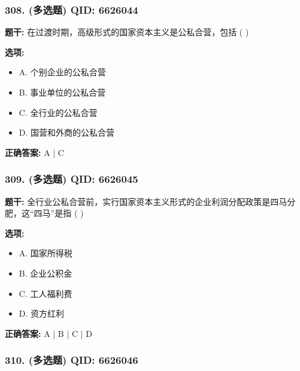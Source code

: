 \documentclass[12pt,UTF8]{ctexart}
\begin{document}
\subsubsection*{308. (多选题) \small QID: 6626044}

\textbf{题干:}
在过渡时期，高级形式的国家资本主义是公私合营，包括  ( )

\textbf{选项:}
\begin{itemize}[leftmargin=*]

  \item A. 个别企业的公私合营

  \item B. 事业单位的公私合营

  \item C. 全行业的公私合营

  \item D. 国营和外商的公私合营

\end{itemize}

\textbf{正确答案:}
A | C

\vspace{0.3em}\hrulefill\vspace{0.7em}

\subsubsection*{309. (多选题) \small QID: 6626045}

\textbf{题干:}
全行业公私合营前，实行国家资本主义形式的企业利润分配政策是四马分肥，这“四马”是指  ( )

\textbf{选项:}
\begin{itemize}[leftmargin=*]

  \item A. 国家所得税

  \item B. 企业公积金

  \item C. 工人福利费

  \item D. 资方红利

\end{itemize}

\textbf{正确答案:}
A | B | C | D

\vspace{0.3em}\hrulefill\vspace{0.7em}

\subsubsection*{310. (多选题) \small QID: 6626046}
\end{document}
